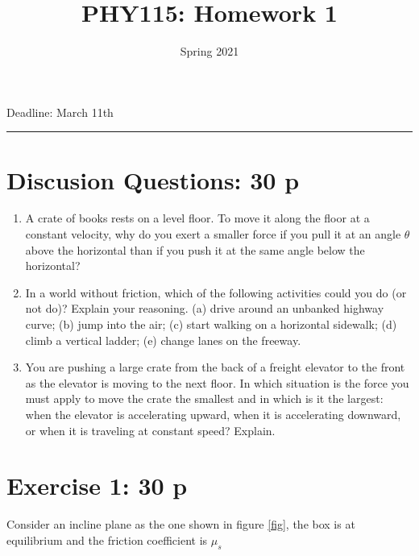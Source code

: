 \documentclass[12pt]{article}
\title{PHY115: Homework 1}
\author{Spring 2021}
\date{}
\newcommand{\blankline}{\quad\pagebreak[2]}
\begin{document}
\maketitle





\begin{center}
 Deadline: March 11th    
\end{center}
\hrule




\section{Discusion Questions: 30 p}

\begin{enumerate}
  \item A crate of books rests on a level floor. To move it along the
  floor at a constant velocity, why do you exert a smaller force if you
  pull it at an angle $\theta$ above the horizontal than if you push it at the
  same angle below the horizontal?
  \item In a world without friction, which of the following activities
  could you do (or not do)? Explain your reasoning. (a) drive around
  an unbanked highway curve; (b) jump into the air; (c) start walking
  on a horizontal sidewalk; (d) climb a vertical ladder; (e) change
  lanes on the freeway.
  \item You are pushing a large crate from the back of a freight elevator
  to the front as the elevator is moving to the next floor. In
  which situation is the force you must apply to move the crate the
  smallest and in which is it the largest: when the elevator is accelerating
  upward, when it is accelerating downward, or when it is traveling
  at constant speed? Explain.
\end{enumerate}

\section*{Exercise 1: 30 p }
Consider an incline plane as the one shown in figure \ref{fig}, the box is at equilibrium and the friction coefficient
is $\mu_s$
\end{document}
